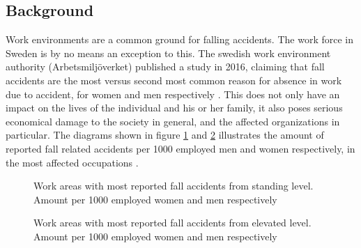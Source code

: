 \documentclass[12pt, a4paper, onecolumn]{article}
\begin{document}
		\subsection{Background}
		
		Work environments are a common ground for falling accidents. The work force in Sweden is by no means an exception to this. The swedish work environment authority (Arbetsmiljöverket) published a study in 2016, claiming that fall accidents are the most versus second most common reason for absence in work due to accident, for women and men respectively \cite[p~1]{av}. This does not only have an impact on the lives of the individual and his or her family, it also poses serious economical damage to the society in general, and the affected organizations in particular. The diagrams shown in figure \ref{fig:Men-Women-Falling-From-Same-Ellevation} and \ref{fig:Men-And-Women-Falling-Form-Elevated-height} illustrates the amount of reported fall related accidents per 1000 employed men and women respectively, in the most affected occupations . 
		
		\begin{figure}[h]
			\centering
			\qquad

			\caption{Work areas with most reported fall accidents from standing level. Amount per 1000 employed women and men respectively}%
			\label{fig:Men-Women-Falling-From-Same-Ellevation}%
		\end{figure}
		
		\begin{figure}[h]
			\centering
			\qquad
			\caption{Work areas with most reported fall accidents from elevated level. Amount per 1000 employed women and men respectively}%
			\label{fig:Men-And-Women-Falling-Form-Elevated-height}%
		\end{figure}
	
\end{document}
